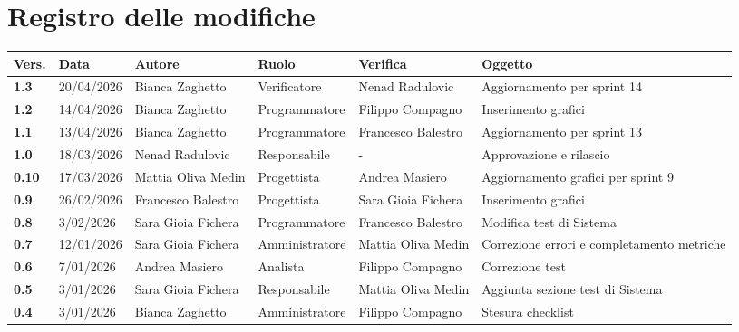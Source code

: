 \documentclass[a4paper,12pt]{article}
\begin{document}
    

    \section*{Registro delle modifiche} {
        \begin{table}[h!]
                \begin{tabularx}{\textwidth}{|l|l|l|l|L|L|}
                \hline
                \textbf{Vers.} & \textbf{Data} & \textbf{Autore} & \textbf{Ruolo} & \textbf{Verifica} & \textbf{Oggetto} \\
                \hline
                \textbf{1.3} & 20/04/2026 & Bianca Zaghetto & Verificatore & Nenad Radulovic & Aggiornamento per sprint 14\\
                \hline
                \textbf{1.2} & 14/04/2026 & Bianca Zaghetto & Programmatore & Filippo Compagno & Inserimento grafici\\
                \hline
                \textbf{1.1} & 13/04/2026 & Bianca Zaghetto & Programmatore & Francesco Balestro & Aggiornamento per sprint 13\\
                \hline
                \textbf{1.0} & 18/03/2026 & Nenad Radulovic & Responsabile & - & Approvazione e rilascio\\
                \hline
                \textbf{0.10} & 17/03/2026 & Mattia Oliva Medin & Progettista & Andrea Masiero & Aggiornamento grafici per sprint 9\\
                \hline
                \textbf{0.9} & 26/02/2026 & Francesco Balestro & Progettista & Sara Gioia Fichera & Inserimento grafici\\
                \hline
                \textbf{0.8} & 3/02/2026 & Sara Gioia Fichera & Programmatore & Francesco Balestro & Modifica test di Sistema\\
                \hline
                \textbf{0.7} & 12/01/2026 & Sara Gioia Fichera & Amministratore & Mattia Oliva Medin & Correzione errori e completamento metriche \\
                \hline
                \textbf{0.6} & 7/01/2026 & Andrea Masiero & Analista & Filippo Compagno & Correzione test \\
                \hline
                \textbf{0.5} & 3/01/2026 & Sara Gioia Fichera & Responsabile & Mattia Oliva Medin & Aggiunta sezione test di Sistema \\
                \hline
                \textbf{0.4} & 3/01/2026 & Bianca Zaghetto & Amministratore & Filippo Compagno & Stesura checklist \\

\end{tabularx}
\end{table}}
\end{document}

